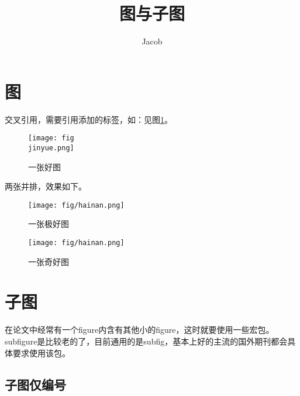 \documentclass[12pt,a4paper]{article}
\author{Jacob}
\title{图与子图}
\begin{document}
\maketitle

\section{图}

交叉引用，需要引用添加的标签，如：见图\ref{a good figure}。

\begin{figure}[!htbp]
  \centering %
  \texttt{[image: fig\\jinyue.png]}%
  \caption{一张好图}
  \label{a good figure}%
\end{figure}

两张并排，效果如下。
\begin{figure}[!htbp]
  \centering
  \begin{minipage}[h]{0.45\textwidth}
  \centering
  \texttt{[image: fig/hainan.png]}%
  \caption{一张极好图}
  \label{a very good figure}%
  \end{minipage}
  \quad
  \begin{minipage}[h]{0.45\textwidth}
  \centering
  \texttt{[image: fig/hainan.png]}
  \caption{一张奇好图}
  \label{an excellent good figure}%
  \end{minipage}
\end{figure}

\section{子图}

在论文中经常有一个figure内含有其他小的figure，这时就要使用一些宏包。
subfigure是比较老的了，目前通用的是subfig，基本上好的主流的国外期刊都会具体要求使用该包。

\subsection{子图仅编号}
\end{document}
